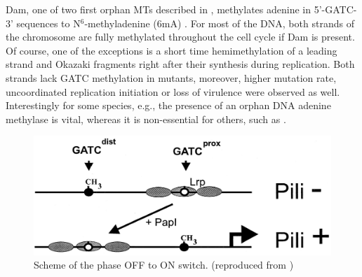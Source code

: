 Dam, one of two first orphan MTs described in , methylates adenine in 5'-GATC-3' sequences to N$^6$-methyladenine (6mA) \cite{marinus1973isolation}.
For most of the DNA, both strands of the chromosome are fully methylated throughout the cell cycle if Dam is present.
Of course, one of the exceptions is a short time hemimethylation of a leading strand and Okazaki fragments right after their synthesis during replication.
Both strands lack GATC methylation in  mutants, moreover, higher mutation rate, uncoordinated replication initiation or loss of virulence were observed as well.
Interestingly for some species, e.g.,  the presence of an orphan DNA adenine methylase is vital, whereas it is non-essential for others, such as  \cite{casadesus2006epigenetic, casadesus2013programmed, adhikari2016dna}.

\begin{figure}[ht!]
  \centering
  \includegraphics[scale=0.3]{text/Pictures/papPili.png}
    \caption{Scheme of the  phase OFF to ON switch. (reproduced from \cite{low2001roles})}
    \label{pap}
\end{figure}

